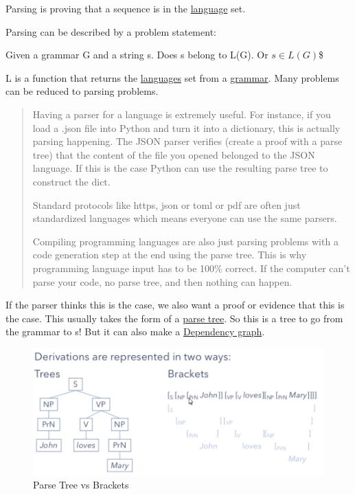 \documentclass[
  11pt,
  british,
]{article}
\begin{document}
Parsing is proving that a sequence is in the
\href{Languages.md}{language} set.

Parsing can be described by a problem statement:

Given a grammar G and a string s. Does s belong to L(G). Or
\(s \in L(G)\)\$

L is a function that returns the \href{Languages.md}{languages} set from
a \href{Grammar.md}{grammar}. Many problems can be reduced to parsing
problems.

\begin{quote}
Having a parser for a language is extremely useful. For instance, if you
load a .json file into Python and turn it into a dictionary, this is
actually parsing happening. The JSON parser verifies (create a proof
with a parse tree) that the content of the file you opened belonged to
the JSON language. If this is the case Python can use the resulting
parse tree to construct the dict.

Standard protocols like https, json or toml or pdf are often just
standardized languages which means everyone can use the same parsers.

Compiling programming languages are also just parsing problems with a
code generation step at the end using the parse tree. This is why
programming language input has to be 100\% correct. If the computer
can't parse your code, no parse tree, and then nothing can happen.
\end{quote}

If the parser thinks this is the case, we also want a proof or evidence
that this is the case. This usually takes the form of a
\href{Parse\%20Tree.md}{parse tree}. So this is a tree to go from the
grammar to s! But it can also make a
\href{Dependency\%20Parsing.md}{Dependency graph}.

\begin{figure}
\centering
\includegraphics{Pasted_image_20220314184733.png}
\caption{Parse Tree vs Brackets}
\end{figure}
\end{document}
